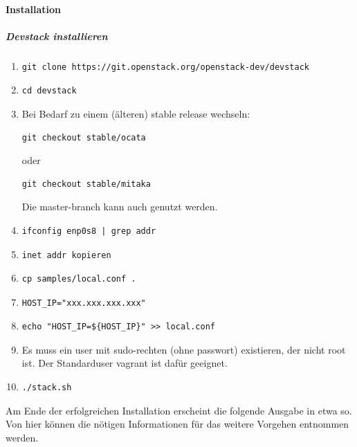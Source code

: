 \documentclass[a4paper,10pt]{article}
\numberwithin{figure}{section}
\numberwithin{table}{section}
\begin{document}
\paragraph{Installation}

\subparagraph{Devstack installieren}

\begin{enumerate}
 \item \begin{verbatim}git clone https://git.openstack.org/openstack-dev/devstack \end{verbatim}
 \item  \begin{verbatim}cd devstack\end{verbatim}
 \item Bei Bedarf zu einem (älteren) stable release wechseln: \begin{verbatim}git checkout stable/ocata\end{verbatim} oder \begin{verbatim}git checkout stable/mitaka\end{verbatim} Die master-branch kann auch genutzt werden.
 \item \begin{verbatim}ifconfig enp0s8 | grep addr\end{verbatim}
 \item \begin{verbatim}inet addr kopieren\end{verbatim}
 \item \begin{verbatim}cp samples/local.conf .\end{verbatim}
 \item \begin{verbatim}HOST_IP="xxx.xxx.xxx.xxx"\end{verbatim}
 \item \begin{verbatim}echo "HOST_IP=${HOST_IP}" >> local.conf\end{verbatim}
 \item Es muss ein user mit sudo-rechten (ohne passwort) existieren, der nicht root ist. Der Standarduser vagrant ist dafür geeignet.
 \item \begin{verbatim}./stack.sh\end{verbatim}
\end{enumerate}

Am Ende der erfolgreichen Installation erscheint die folgende Ausgabe in etwa so.
Von hier können die nötigen Informationen für das weitere Vorgehen entnommen werden.
\end{document}
